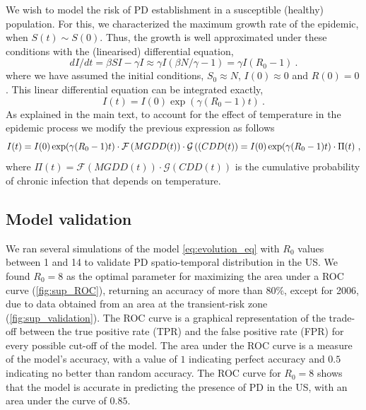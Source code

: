 We wish to model the risk of PD establishment in a susceptible (healthy)
population. For this, we characterized the maximum growth rate of the epidemic,
when $S(t)\sim S(0)$. Thus, the growth is well approximated under these
conditions with
the (linearised) differential equation,
\begin{equation}
    dI/dt=\beta SI-\gamma I\approx \gamma I(\beta N/\gamma - 1)=\gamma
    I(R_0-1) \ .
\end{equation}
where we have assumed the initial conditions,
$S_0\approx N$, $I(0)\approx0$ and $R(0)=0$. This linear differential
equation can be integrated exactly,
\begin{equation}\label{eq: infect_proc}
    I(t)=I(0)\exp(\gamma(R_0-1)t) \ .
\end{equation}
As explained in the main text, to account for the effect of temperature in
the epidemic process we modify the previous expression as follows
\begin{equation}\label{eq: final_eq}
    I(t)=I(0)\exp(\gamma(R_0-1)t)\cdot \mathcal{F}\left(MGDD(t)\right)\cdot
    \mathcal{G}\left((CDD(t)\right)= I(0)\exp(\gamma(R_0-1)t)\cdot\Pi(t) \ ,
\end{equation}
where $\Pi(t)=\mathcal{F}(MGDD(t))\cdot \mathcal{G}(CDD(t))$ is the
cumulative probability of chronic infection that depends on temperature.

\subsection{Model validation}

We ran several simulations of the model \cref{eq:evolution_eq} with $R_0$
values between 1 and 14 to validate PD spatio-temporal distribution in the
US.
We found $R_0=8$ as the optimal parameter for maximizing the area under a
ROC
curve (\cref{fig:sup_ROC}), returning an accuracy of more than $80 \%$,
except for 2006, due to data obtained from an area at the transient-risk
zone
(\cref{fig:sup_validation}). The ROC curve is a graphical representation of
the trade-off between the true positive rate (TPR) and the false positive
rate (FPR) for every possible cut-off of the model. The area under the ROC
curve is a measure of the model's accuracy, with a value of $1$ indicating
perfect accuracy and $0.5$ indicating no better than random accuracy. The
ROC curve for $R_0=8$ shows that the model is accurate in predicting the
presence of PD in the US, with an area under the curve of $0.85$.


